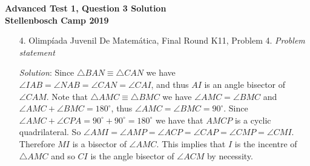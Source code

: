 \documentclass{article}
\begin{document}
\begin{center}
  \textbf{\Large Advanced Test 1, Question 3 Solution}
  \\ \vspace{1em}
  \textbf{\large Stellenbosch Camp 2019}
\end{center}


\begin{enumerate}

\item[4.] Olimp\'iada Juvenil De Matem\'atica, Final Round K11, Problem 4.
\textit{Problem statement}

\textit{Solution}:
Since $\triangle BAN \equiv \triangle CAN$ we have $\angle IAB = \angle NAB = \angle CAN = \angle CAI $, and thus $AI$ is an angle bisector of $\angle CAM$.
Note that $\triangle AMC \equiv \triangle BMC$ we have $\angle AMC = \angle BMC$ and $\angle AMC + \angle BMC =180^\circ$, thus $\angle AMC = \angle BMC = 90^\circ$.
Since $\angle AMC + \angle CPA = 90^\circ +90^\circ =180^\circ$ we have that $AMCP$ is a cyclic quadrilateral.
So $\angle AMI = \angle AMP = \angle ACP = \angle CAP = \angle CMP = \angle CMI$.
Therefore $MI$ is a bisector of $\angle AMC$.
This implies that $I$ is the incentre of $\triangle AMC$ and so $CI$ is the angle bisector of $\angle ACM$ by necessity.

\end{enumerate}
\end{document}
